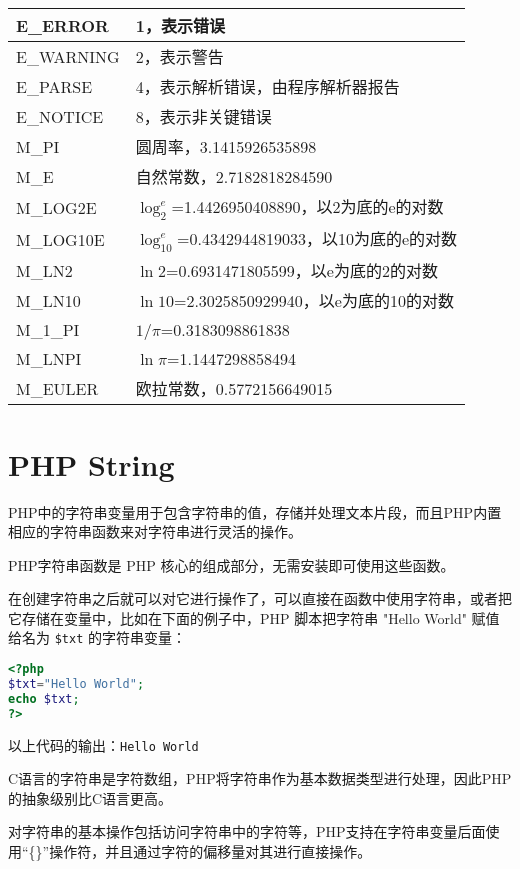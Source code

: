 \begin{longtable}{|p{80pt}|p{300pt}|}
\hline
E\_ERROR & 1，表示错误\\
\hline
E\_WARNING& 2，表示警告\\
\hline
E\_PARSE & 4，表示解析错误，由程序解析器报告\\
\hline
E\_NOTICE & 8，表示非关键错误\\
\hline
M\_PI & 圆周率，3.1415926535898\\
\hline
M\_E & 自然常数，2.7182818284590\\
\hline
M\_LOG2E & $\log_2^e$=1.4426950408890，以2为底的e的对数\\
\hline
M\_LOG10E & $\log_{10}^e$=0.4342944819033，以10为底的e的对数\\
\hline
M\_LN2&$\ln2$=0.6931471805599，以e为底的2的对数\\
\hline
M\_LN10& $\ln10$=2.3025850929940，以e为底的10的对数\\
\hline
M\_1\_PI&$1/\pi$=0.3183098861838\\
\hline
M\_LNPI&$\ln\pi$=1.1447298858494\\
\hline
M\_EULER&欧拉常数，0.5772156649015\\
\hline
\end{longtable}







\chapter{PHP String}




PHP中的字符串变量用于包含字符串的值，存储并处理文本片段，而且PHP内置相应的字符串函数来对字符串进行灵活的操作。

PHP字符串函数是 PHP 核心的组成部分，无需安装即可使用这些函数。


在创建字符串之后就可以对它进行操作了，可以直接在函数中使用字符串，或者把它存储在变量中，比如在下面的例子中，PHP 脚本把字符串 "Hello World" 赋值给名为 \texttt{\$txt} 的字符串变量：


\begin{lstlisting}[language=PHP]
<?php
$txt="Hello World";
echo $txt;
?>
\end{lstlisting}


以上代码的输出：\verb|Hello World|

C语言的字符串是字符数组，PHP将字符串作为基本数据类型进行处理，因此PHP的抽象级别比C语言更高。

对字符串的基本操作包括访问字符串中的字符等，PHP支持在字符串变量后面使用“\{\}”操作符，并且通过字符的偏移量对其进行直接操作。



